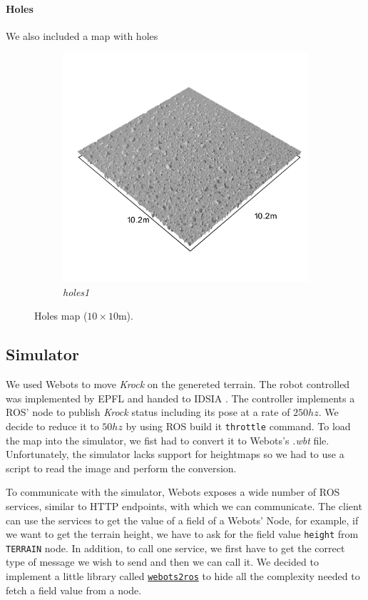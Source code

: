 \documentclass[../document.tex]{subfiles}
\begin{document}
\paragraph{Holes} We also included a map with holes
\begin{figure}[htbp]
    \centering
        \begin{subfigure}[b]{0.32\textwidth}
            \includegraphics[width=\textwidth]{../img/hm3d_borders/holes1.png}
            \caption{\emph{holes1}}
        \end{subfigure}
\caption{Holes map ($10\times10$m).}
\end{figure}
\subsection{Simulator}
We used Webots to move \emph{Krock} on the genereted terrain. The robot controlled was implemented by EPFL  and handed to IDSIA . The controller implements a ROS' node to publish \emph{Krock} status including its pose at a rate of $250hz$. We decide to reduce it to $50hz$ by using ROS build it \texttt{throttle} command. 
To load the map into the simulator, we fist had to convert it to Webots's \emph{.wbt} file. Unfortunately, the simulator lacks support for heightmaps so we had to use a script to read the image and perform the conversion.

To communicate with the simulator, Webots exposes a wide number of ROS services, similar to HTTP endpoints, with which we can communicate. The client can use the services to get the value of a field of a Webots' Node, for example, if we want to get the terrain height, we have to ask for the field value \texttt{height} from \texttt{TERRAIN} node. In addition, to call one service, we first have to get the correct type of message we wish to send and then we can call it. We decided to implement a little library called \href{https://github.com/FrancescoSaverioZuppichini/Master-Thesis/tree/master/core/utilities/webots2ros}{\texttt{webots2ros}} to hide all the complexity needed to fetch a field value from a node.
\end{document}

